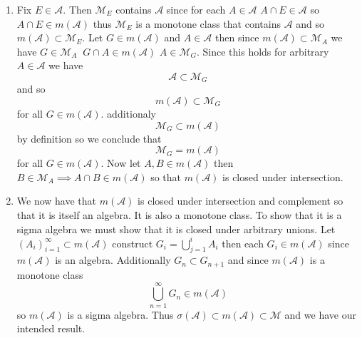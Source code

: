 \documentclass[11pt]{article}
\begin{document}
{\begin{enumerate}
\[            \] 
            Thus $C \in  \mathcal{M}_E$
            SImilarly
            \[
                \bigcap_{n=1}^{\infty}(B_n) = D \in m( \mathcal{A}) \qquad \bigcap_{n=1}^{\infty}(B_n \cap E) = E \cap \left(\bigcap_{n=1}^{\infty}B_n\right) = E \cap D \in m( \mathcal{A})
            \] 
            and so $D \in \mathcal{M}_E$ so  $\mathcal{M}_E$ is a monotone class
        \item Fix  $ E \in \mathcal{A}$.  Then $ \mathcal{M}_E$ contains  $ \mathcal{A}$ since for each $ A \in \mathcal{A}$ $ A \cap E \in \mathcal{A}$ so $ A \cap E \in m( \mathcal{A})$ thus $ \mathcal{M}_E$ is a monotone 
            class that contains  $ \mathcal{A}$ and so $m( \mathcal{A}) \subset \mathcal{M}_E$.
            Let $G \in m( \mathcal{A})$ and $A \in \mathcal{A}$ then since $m( \mathcal{A}) \subset \mathcal{M}_A$ we have $ G \in \mathcal{M}_A \;\; G \cap A \in m( \mathcal{A})$  $A \in \mathcal{M}_G$. Since this holds for arbitrary $ A \in \mathcal{A}$ we have
            \[
                \mathcal{A} \subset \mathcal{M}_G
            \] 
            and so
            \[
                m( \mathcal{A}) \subset \mathcal{M}_G
            \] 
            for all $G \in m( \mathcal{A})$. additionaly
            \[
                \mathcal{M}_G \subset m( \mathcal{A})
            \] 
            by definition so we conclude that
            \[
                \mathcal{M}_G = m( \mathcal{A})
            \] 
            for all $G \in m( \mathcal{A})$. Now let $A, B \in m( \mathcal{A})$ then $B \in \mathcal{M}_A \implies A \cap B \in m( \mathcal{A})$ so that $m( \mathcal{A})$ is closed under intersection.
        \item We now have that $m( \mathcal{A})$ is closed under intersection and complement so that it is itself an algebra. It is also a monotone class. To show that
            it is a sigma algebra we must show that it is closed under arbitrary unions. Let $(A_i)_{i=1}^{\infty} \subset m( \mathcal{A})$ construct $G_i = \bigcup_{j=1}^{i} A_i$ then each $G_i \in m( \mathcal{A})$ since $m( \mathcal{A})$ is an algebra.
            Additionally $G_n \subset G_{n+1}$ and since $m( \mathcal{A})$ is a monotone class
            \[
                \bigcup_{n=1}^{\infty}G_n \in m( \mathcal{A})
            \] 
            so $m( \mathcal{A})$ is a sigma algebra. Thus $\sigma( \mathcal{A}) \subset m( \mathcal{A}) \subset \mathcal{M}$ and we have our intended result.
    \end{enumerate}
}
\end{document}
